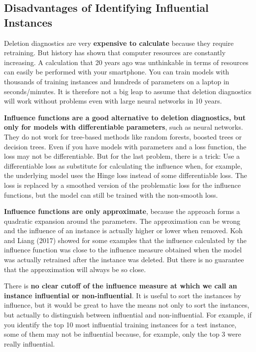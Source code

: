 \documentclass[
  12pt,
]{krantz}
\begin{document}
\hypertarget{disadvantages-of-identifying-influential-instances}{%
\subsection{Disadvantages of Identifying Influential Instances}\label{disadvantages-of-identifying-influential-instances}}

Deletion diagnostics are very \textbf{expensive to calculate} because they require retraining.
But history has shown that computer resources are constantly increasing.
A calculation that 20 years ago was unthinkable in terms of resources can easily be performed with your smartphone.
You can train models with thousands of training instances and hundreds of parameters on a laptop in seconds/minutes.
It is therefore not a big leap to assume that deletion diagnostics will work without problems even with large neural networks in 10 years.

\textbf{Influence functions are a good alternative to deletion diagnostics, but only for models with differentiable parameters}, such as neural networks.
They do not work for tree-based methods like random forests, boosted trees or decision trees.
Even if you have models with parameters and a loss function, the loss may not be differentiable.
But for the last problem, there is a trick:
Use a differentiable loss as substitute for calculating the influence when, for example, the underlying model uses the Hinge loss instead of some differentiable loss.
The loss is replaced by a smoothed version of the problematic loss for the influence functions, but the model can still be trained with the non-smooth loss.

\textbf{Influence functions are only approximate}, because the approach forms a quadratic expansion around the parameters.
The approximation can be wrong and the influence of an instance is actually higher or lower when removed.
Koh and Liang (2017) showed for some examples that the influence calculated by the influence function was close to the influence measure obtained when the model was actually retrained after the instance was deleted.
But there is no guarantee that the approximation will always be so close.

There is \textbf{no clear cutoff of the influence measure at which we call an instance influential or non-influential}.
It is useful to sort the instances by influence, but it would be great to have the means not only to sort the instances, but actually to distinguish between influential and non-influential.
For example, if you identify the top 10 most influential training instances for a test instance, some of them may not be influential because, for example, only the top 3 were really influential.
\end{document}

